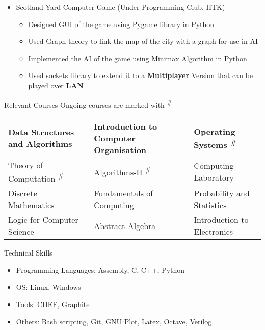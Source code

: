 \documentclass{article}
\begin{document}
\begin{itemize}
\item {\large Scotland Yard Computer Game}\newline
(Under Programming Club, IITK)\hspace*{\fill}
	\begin{itemize}
	\item Designed GUI of the game using Pygame library in Python
	\item Used Graph theory to link the map of the city with a graph for use in AI
	\item Implemented the AI of the game using Minimax Algorithm in Python

	\item Used sockets library to extend it to a \textbf{Multiplayer} Version that can be played over \textbf{LAN}
	\end{itemize}
	\end{itemize}
\vspace{10pt}	
{\Large Relevant Courses}
\newline
Ongoing courses are marked with \textsuperscript{\#}
\newline
\newline
\begin{tabular}{|m{5.7cm} | m{6.3cm}| m{5.3cm} |}
\hline
Data Structures and Algorithms  & Introduction to Computer Organisation &  Operating Systems \textsuperscript{\#} \\
\hline
Theory of Computation \textsuperscript{\#} & Algorithms-II \textsuperscript{\#} &  Computing Laboratory\\
\hline
Discrete Mathematics &Fundamentals of Computing & Probability and Statistics\\
\hline
Logic for Computer Science & Abstract Algebra & Introduction to Electronics\\
\hline

\end{tabular}
\newline
\newline
\newline
{\Large Technical Skills}
\begin{itemize}
\item Programming Languages: Assembly, C, C++, Python
\item OS: Linux, Windows 
\item Tools: CHEF, Graphite
\item Others: Bash scripting, Git, GNU Plot, Latex, Octave, Verilog
\end{itemize} 
\end{document}
